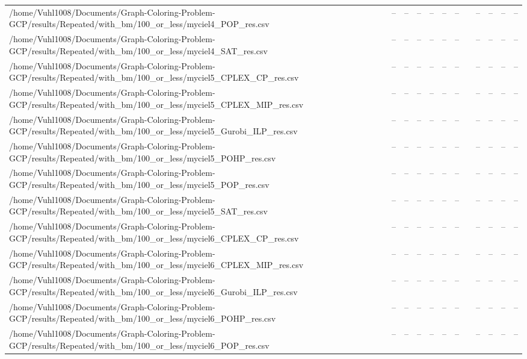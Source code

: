 \begin{table}[htbp]
\begin{tabular}{llllllllllll}
/home/Vuhl1008/Documents/Graph-Coloring-Problem-GCP/results/Repeated/with\_bm/100\_or\_less/myciel4\_POP\_res.csv & -- & -- & -- & -- & -- & -- & {} & -- & -- & -- & -- \\
/home/Vuhl1008/Documents/Graph-Coloring-Problem-GCP/results/Repeated/with\_bm/100\_or\_less/myciel4\_SAT\_res.csv & -- & -- & -- & -- & -- & -- & {} & -- & -- & -- & -- \\
/home/Vuhl1008/Documents/Graph-Coloring-Problem-GCP/results/Repeated/with\_bm/100\_or\_less/myciel5\_CPLEX\_CP\_res.csv & -- & -- & -- & -- & -- & -- & {} & -- & -- & -- & -- \\
/home/Vuhl1008/Documents/Graph-Coloring-Problem-GCP/results/Repeated/with\_bm/100\_or\_less/myciel5\_CPLEX\_MIP\_res.csv & -- & -- & -- & -- & -- & -- & {} & -- & -- & -- & -- \\
/home/Vuhl1008/Documents/Graph-Coloring-Problem-GCP/results/Repeated/with\_bm/100\_or\_less/myciel5\_Gurobi\_ILP\_res.csv & -- & -- & -- & -- & -- & -- & {} & -- & -- & -- & -- \\
/home/Vuhl1008/Documents/Graph-Coloring-Problem-GCP/results/Repeated/with\_bm/100\_or\_less/myciel5\_POHP\_res.csv & -- & -- & -- & -- & -- & -- & {} & -- & -- & -- & -- \\
/home/Vuhl1008/Documents/Graph-Coloring-Problem-GCP/results/Repeated/with\_bm/100\_or\_less/myciel5\_POP\_res.csv & -- & -- & -- & -- & -- & -- & {} & -- & -- & -- & -- \\
/home/Vuhl1008/Documents/Graph-Coloring-Problem-GCP/results/Repeated/with\_bm/100\_or\_less/myciel5\_SAT\_res.csv & -- & -- & -- & -- & -- & -- & {} & -- & -- & -- & -- \\
/home/Vuhl1008/Documents/Graph-Coloring-Problem-GCP/results/Repeated/with\_bm/100\_or\_less/myciel6\_CPLEX\_CP\_res.csv & -- & -- & -- & -- & -- & -- & {} & -- & -- & -- & -- \\
/home/Vuhl1008/Documents/Graph-Coloring-Problem-GCP/results/Repeated/with\_bm/100\_or\_less/myciel6\_CPLEX\_MIP\_res.csv & -- & -- & -- & -- & -- & -- & {} & -- & -- & -- & -- \\
/home/Vuhl1008/Documents/Graph-Coloring-Problem-GCP/results/Repeated/with\_bm/100\_or\_less/myciel6\_Gurobi\_ILP\_res.csv & -- & -- & -- & -- & -- & -- & {} & -- & -- & -- & -- \\
/home/Vuhl1008/Documents/Graph-Coloring-Problem-GCP/results/Repeated/with\_bm/100\_or\_less/myciel6\_POHP\_res.csv & -- & -- & -- & -- & -- & -- & {} & -- & -- & -- & -- \\
/home/Vuhl1008/Documents/Graph-Coloring-Problem-GCP/results/Repeated/with\_bm/100\_or\_less/myciel6\_POP\_res.csv & -- & -- & -- & -- & -- & -- & {} & -- & -- & -- & -- \\

\end{tabular}
\end{table}

